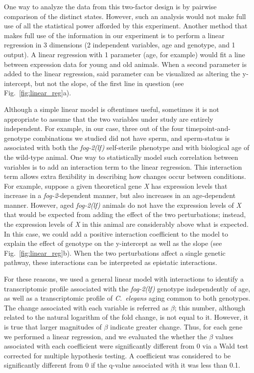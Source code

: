 \documentclass[9pt,twocolumn,twoside]{gsag3jnl}
\newcommand{\cel}{\emph{C.~elegans}}
\newcommand{\fog}{\emph{\mbox{fog-2(lf)}}}
\newcommand{\gene}[1]{\emph{\mbox{#1}}}
\begin{document}
One way to analyze the data from this two-factor design is by pairwise
comparison of the distinct states. However, such an analysis would not make full
use of all the statistical power afforded by this experiment. Another method
that makes full use of the information in our experiment is to perform a linear
regression in 3 dimensions (2 independent variables, age and genotype, and 1
output). A linear regression with 1 parameter (age, for example) would fit a
line between expression data for young and old animals. When a second parameter
is added to the linear regression, said parameter can be visualized as altering
the y-intercept, but not the slope, of the first line in question (see
Fig.~\ref{fig:linear_reg}a).

Although a simple linear model is oftentimes useful, sometimes it is not
appropriate to assume that the two variables under study are entirely
independent. For example, in our case, three out of the four
timepoint-and-genotype combinations we studied did not have sperm, and
sperm-status is associated with both the \fog{} self-sterile phenotype and with
biological age of the wild-type animal. One way to statistically model such
correlation between variables is to add an interaction term to the linear
regression. This interaction term allows extra flexibility in describing how
changes occur between conditions. For example, suppose a given theoretical gene
\gene{X} has expression levels that increase in a \gene{fog-2}-dependent manner,
but also increases in an age-dependent manner. However, aged \fog{} animals do
not have the expression levels of \gene{X} that would be expected from adding
the effect of the two perturbations; instead, the expression levels of \gene{X}
in this animal are considerably above what is expected. In this case, we could
add a positive interaction coefficient to the model to explain the effect of
genotype on the y-intercept as well as the slope (see
Fig.~\ref{fig:linear_reg}b). When the two perturbations affect a single genetic
pathway, these interactions can be interpreted as epistatic interactions.

For these reasons, we used a general linear model with interactions to identify
a transcriptomic profile associated with the \fog{} genotype independently of
age, as well as a transcriptomic profile of \cel{} aging common to both
genotypes. The change associated with each variable is referred as $\beta$; this
number, although related to the natural logarithm of the fold change, is not
equal to it. However, it is true that larger magnitudes of $\beta$ indicate
greater change. Thus, for each gene we performed a linear regression, and we
evaluated the whether the $\beta$ values associated with each coefficient were
significantly different from 0 via a Wald test corrected for multiple hypothesis
testing. A coefficient was considered to be significantly different from 0 if
the q-value associated with it was less than 0.1.
\end{document}
